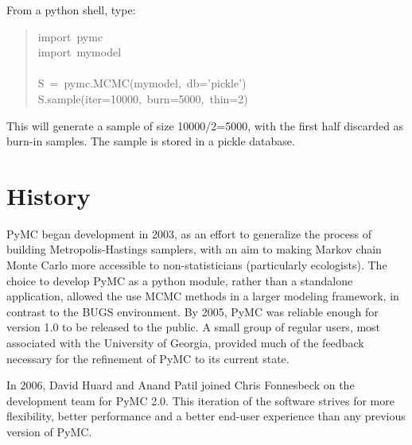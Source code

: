 From a python shell, type:
\begin{quote}{\ttfamily \raggedright \noindent
import~pymc~\\
import~mymodel~\\
~\\
S~=~pymc.MCMC(mymodel,~db='pickle')~\\
S.sample(iter=10000,~burn=5000,~thin=2)
}\end{quote}

This will generate a sample of size 10000/2=5000, with the first half discarded as burn-in samples. The sample is stored in a pickle database.



\hypertarget{history}{}
\section*{History}
\label{history}

PyMC began development in 2003, as an effort to generalize the process of building Metropolis-Hastings samplers, with an aim to making Markov chain Monte Carlo more accessible to non-statisticians (particularly ecologists). The choice to develop PyMC as a python module, rather than a standalone application, allowed the use MCMC methods in a larger modeling framework, in contrast to the BUGS environment. By 2005, PyMC was reliable enough for version 1.0 to be released to the public. A small group of regular users, most associated with the University of Georgia, provided much of the feedback necessary for the refinement of PyMC to its current state.

In 2006, David Huard and Anand Patil joined Chris Fonnesbeck on the development team for PyMC 2.0. This iteration of the software strives for more flexibility, better performance and a better end-user experience than any previous version of PyMC.



